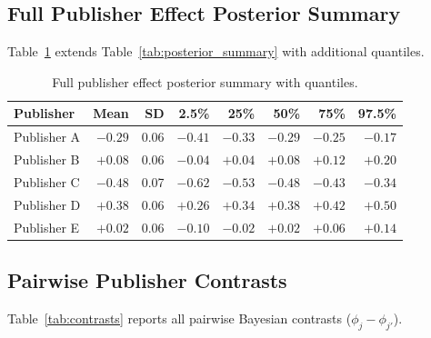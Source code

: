 \documentclass[10pt,letterpaper]{article}
\begin{document}
\subsection*{Full Publisher Effect Posterior Summary}

Table~\ref{tab:full_posterior} extends Table~\ref{tab:posterior_summary} with
additional quantiles.

\begin{table}[h]
\centering
\caption{Full publisher effect posterior summary with quantiles.}
\label{tab:full_posterior}
\begin{tabular}{lrrrrrrr}
\toprule
\textbf{Publisher} & \textbf{Mean} & \textbf{SD}
  & \textbf{2.5\%} & \textbf{25\%} & \textbf{50\%} & \textbf{75\%} & \textbf{97.5\%} \\
\midrule
Publisher A & $-0.29$ & 0.06 & $-0.41$ & $-0.33$ & $-0.29$ & $-0.25$ & $-0.17$ \\
Publisher B & $+0.08$ & 0.06 & $-0.04$ & $+0.04$ & $+0.08$ & $+0.12$ & $+0.20$ \\
Publisher C & $-0.48$ & 0.07 & $-0.62$ & $-0.53$ & $-0.48$ & $-0.43$ & $-0.34$ \\
Publisher D & $+0.38$ & 0.06 & $+0.26$ & $+0.34$ & $+0.38$ & $+0.42$ & $+0.50$ \\
Publisher E & $+0.02$ & 0.06 & $-0.10$ & $-0.02$ & $+0.02$ & $+0.06$ & $+0.14$ \\
\bottomrule
\end{tabular}
\end{table}

\subsection*{Pairwise Publisher Contrasts}

Table~\ref{tab:contrasts} reports all pairwise Bayesian contrasts
($\phi_j - \phi_{j'}$).
\end{document}
